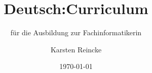 \documentclass[]{beamer}
\title{Deutsch:Curriculum}
\subtitle{für die Ausbildung zur Fachinformatikerin}
\institute{GS-LDK}
\author{Karsten Reincke}
\date{\today}
\def\cfgGl{../../../cfg.gl/}
\begin{document}

\begin{frame}
  \titlepage
\end{frame}





\logo{}
\newpage




\end{document}
